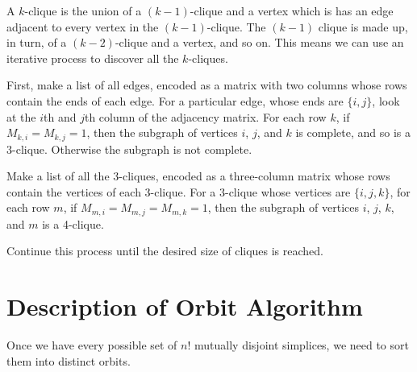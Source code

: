 \documentclass[12pt]{scrippsthesis}
\theoremstyle{definition}
\theoremstyle{remark}
\theoremstyle{plain}
\begin{document}
A $k$-clique is the union of a $(k-1)$-clique and a vertex which is has an edge adjacent to every vertex in the $(k-1)$-clique.  The $(k-1)$ clique is made up, in turn, of a $(k-2)$-clique and a vertex, and so on.  This means we can use an iterative process to discover all the $k$-cliques.  

First, make a list of all edges, encoded as a matrix with two columns whose rows contain the ends of each edge.  For a particular edge, whose ends are $\{i, j\}$, look at the $i$th and $j$th column of the adjacency matrix.  For each row $k$, if $M_{k,i}=M_{k,j}=1$, then the subgraph of vertices $i$, $j$, and $k$ is complete, and so is a 3-clique.  Otherwise the subgraph is not complete.

Make a list of all the 3-cliques, encoded as a three-column matrix whose rows contain the vertices of each 3-clique.  For a 3-clique whose vertices are $\{i, j, k\}$, for each row $m$, if $M_{m,i}=M_{m,j}=M_{m,k}=1$, then the subgraph of vertices $i$, $j$, $k$, and $m$ is a 4-clique.

Continue this process until the desired size of cliques is reached.


\section{Description of Orbit Algorithm}

Once we have every possible set of $n!$ mutually disjoint simplices, we need to sort them into distinct orbits.
\end{document}
